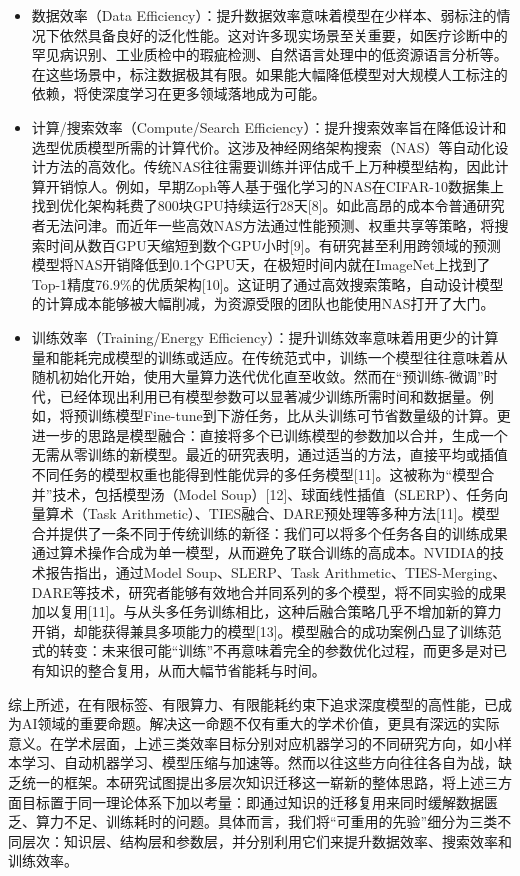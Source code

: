 \begin{itemize}
	\item 数据效率（Data Efficiency）：提升数据效率意味着模型在少样本、弱标注的情况下依然具备良好的泛化性能。这对许多现实场景至关重要，如医疗诊断中的罕见病识别、工业质检中的瑕疵检测、自然语言处理中的低资源语言分析等。在这些场景中，标注数据极其有限。如果能大幅降低模型对大规模人工标注的依赖，将使深度学习在更多领域落地成为可能。
	\item 计算/搜索效率（Compute/Search Efficiency）：提升搜索效率旨在降低设计和选型优质模型所需的计算代价。这涉及神经网络架构搜索（NAS）等自动化设计方法的高效化。传统NAS往往需要训练并评估成千上万种模型结构，因此计算开销惊人。例如，早期Zoph等人基于强化学习的NAS在CIFAR-10数据集上找到优化架构耗费了800块GPU持续运行28天[8]。如此高昂的成本令普通研究者无法问津。而近年一些高效NAS方法通过性能预测、权重共享等策略，将搜索时间从数百GPU天缩短到数个GPU小时[9]。有研究甚至利用跨领域的预测模型将NAS开销降低到0.1个GPU天，在极短时间内就在ImageNet上找到了Top-1精度76.9\%的优质架构[10]。这证明了通过高效搜索策略，自动设计模型的计算成本能够被大幅削减，为资源受限的团队也能使用NAS打开了大门。
	\item 训练效率（Training/Energy Efficiency）：提升训练效率意味着用更少的计算量和能耗完成模型的训练或适应。在传统范式中，训练一个模型往往意味着从随机初始化开始，使用大量算力迭代优化直至收敛。然而在“预训练-微调”时代，已经体现出利用已有模型参数可以显著减少训练所需时间和数据量。例如，将预训练模型Fine-tune到下游任务，比从头训练可节省数量级的计算。更进一步的思路是模型融合：直接将多个已训练模型的参数加以合并，生成一个无需从零训练的新模型。最近的研究表明，通过适当的方法，直接平均或插值不同任务的模型权重也能得到性能优异的多任务模型[11]。这被称为“模型合并”技术，包括模型汤（Model Soup）[12]、球面线性插值（SLERP）、任务向量算术（Task Arithmetic）、TIES融合、DARE预处理等多种方法[11]。模型合并提供了一条不同于传统训练的新径：我们可以将多个任务各自的训练成果通过算术操作合成为单一模型，从而避免了联合训练的高成本。NVIDIA的技术报告指出，通过Model Soup、SLERP、Task Arithmetic、TIES-Merging、DARE等技术，研究者能够有效地合并同系列的多个模型，将不同实验的成果加以复用[11]。与从头多任务训练相比，这种后融合策略几乎不增加新的算力开销，却能获得兼具多项能力的模型[13]。模型融合的成功案例凸显了训练范式的转变：未来很可能“训练”不再意味着完全的参数优化过程，而更多是对已有知识的整合复用，从而大幅节省能耗与时间。
\end{itemize}

综上所述，在有限标签、有限算力、有限能耗约束下追求深度模型的高性能，已成为AI领域的重要命题。解决这一命题不仅有重大的学术价值，更具有深远的实际意义。在学术层面，上述三类效率目标分别对应机器学习的不同研究方向，如小样本学习、自动机器学习、模型压缩与加速等。然而以往这些方向往往各自为战，缺乏统一的框架。本研究试图提出多层次知识迁移这一崭新的整体思路，将上述三方面目标置于同一理论体系下加以考量：即通过知识的迁移复用来同时缓解数据匮乏、算力不足、训练耗时的问题。具体而言，我们将“可重用的先验”细分为三类不同层次：知识层、结构层和参数层，并分别利用它们来提升数据效率、搜索效率和训练效率。

